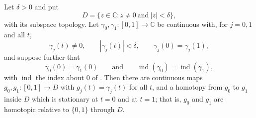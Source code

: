 \begin{lemma}
Let $\delta>0$ and put
\[
  D=\{z\in\mathbb{C}:z\neq0\ \text{and}\ |z|<\delta\},
\]
with its subspace topology.  Let $\gamma_0,\gamma_1\colon[0,1]\to\mathbb{C}$ be
continuous with, for $j=0,1$ and all $t$,
\[
  \gamma_j(t)\neq0,\qquad |\gamma_j(t)|<\delta,\qquad \gamma_j(0)=\gamma_j(1),
\]
and suppose further that
\[
  \gamma_0(0)=\gamma_1(0)
  \qquad\text{and}\qquad
  \operatorname{ind}(\gamma_0)=\operatorname{ind}(\gamma_1),
\]
with $\operatorname{ind}$ the index about $0$ of .  Then
there are continuous maps $g_0,g_1\colon[0,1]\to D$ with $g_j(t)=\gamma_j(t)$
for all $t$, and a homotopy from $g_0$ to $g_1$ inside $D$ which is stationary
at $t=0$ and at $t=1$; that is, $g_0$ and $g_1$ are homotopic relative to
$\{0,1\}$ through $D$.
\end{lemma}
